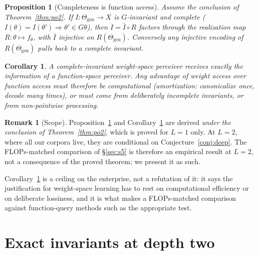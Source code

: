 \documentclass[10pt,twocolumn,letterpaper]{article}
\newtheorem{proposition}[theorem]{Proposition}
\newtheorem{corollary}[theorem]{Corollary}
\theoremstyle{definition}
\newtheorem{remark}[theorem]{Remark}
\newcommand{\Thgen}{\Theta_{\mathrm{gen}}}
\begin{document}
\begin{proposition}[Completeness is function access]\label{prop:po6}
Assume the conclusion of Theorem~\ref{thm:po2}. If $I : \Thgen \to X$ is $G$-invariant and
\emph{complete} ($I(\theta)=I(\theta') \Rightarrow \theta' \in G\theta$), then $I = \bar I \circ R$
factors through the realization map $R:\theta \mapsto f_\theta$, with $\bar I$ injective on
$R(\Thgen)$. Conversely any injective encoding of $R(\Thgen)$ pulls back to a complete invariant.
\end{proposition}

\begin{corollary}\label{cor:ceiling}
A complete-invariant weight-space perceiver receives \emph{exactly} the information of a
function-space perceiver. Any advantage of weight access over function access must therefore be
computational (amortization: canonicalize once, decode many times), or must come from
deliberately \emph{incomplete} invariants, or from non-pointwise processing.
\end{corollary}

\begin{remark}[Scope]\label{rem:scope}
Proposition~\ref{prop:po6} and Corollary~\ref{cor:ceiling} are derived \emph{under the conclusion
of Theorem~\ref{thm:po2}}, which is proved for $L=1$ only. At $L=2$, where all our corpora live,
they are conditional on Conjecture~\ref{conj:deep}. The FLOPs-matched comparison of
\S\ref{sec:s5} is therefore an empirical result at $L=2$, not a consequence of the proved theorem;
we present it as such.
\end{remark}

Corollary~\ref{cor:ceiling} is a ceiling on the enterprise, not a refutation of it: it says the
justification for weight-space learning has to rest on computational efficiency or on
deliberate lossiness, and it is what makes a FLOPs-matched comparison against function-query
methods such as \citet{horwitz2025probegen} the appropriate test.

\section{Exact invariants at depth two}\label{sec:deep}
\end{document}
